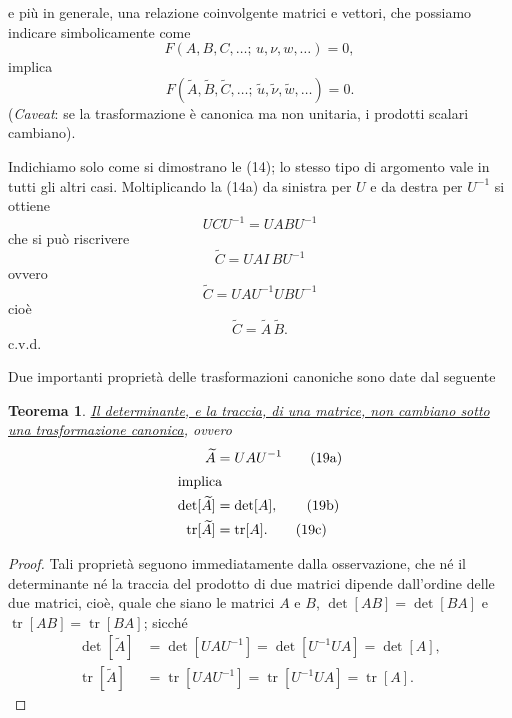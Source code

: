 \documentclass[11pt, a4paper]{book}
\numberwithin{equation}{section}
\newtheorem{teorema}{Teorema}[section]
\begin{document}

e più in generale, una relazione coinvolgente matrici e vettori, che
possiamo indicare simbolicamente come
\begin{equation}
F(A, B, C, \ldots;\, u, \nu, w, \ldots) = 0, \tag{17a}
\end{equation}
implica
\begin{equation}
F(\widetilde{A}, \widetilde{B}, \widetilde{C}, \ldots;\,
  \widetilde{u}, \widetilde{\nu}, \widetilde{w}, \ldots) = 0.
\tag{17b}
\end{equation}
(\emph{Caveat}: se la trasformazione è canonica ma non unitaria, i prodotti
scalari cambiano).

Indichiamo solo come si dimostrano le (14); lo stesso tipo di argomento
vale in tutti gli altri casi. Moltiplicando la (14a) da sinistra per $U$ e
da destra per $U^{-1}$ si ottiene
\[
UCU^{-1} = UABU^{-1}
\]
che si può riscrivere
\[
\widetilde{C} = UAI\,BU^{-1}
\]
ovvero
\[
\widetilde{C} = UAU^{-1}UBU^{-1}
\]
cioè
\[
\widetilde{C} = \widetilde{A}\,\widetilde{B}.
\]
c.v.d.

Due importanti proprietà delle trasformazioni canoniche sono date dal
seguente

\begin{teorema}
\uline{Il determinante, e la traccia, di una matrice, non cambiano sotto
una trasformazione canonica}, ovvero
\begin{align}
\widetilde{A} &= UAU^{-1} \tag{19a} \\
\shortintertext{implica}
\det[\widetilde{A}] &= \det[A], \tag{19b} \\
\operatorname{tr}[\widetilde{A}] &= \operatorname{tr}[A]. \tag{19c}
\end{align}
\end{teorema}

\begin{proof}
Tali proprietà seguono immediatamente dalla osservazione, che né il
determinante né la traccia del prodotto di due matrici dipende
dall'ordine delle due matrici, cioè, quale che siano le matrici $A$ e
$B$, $\det[AB] = \det[BA]$ e $\operatorname{tr}[AB] =
\operatorname{tr}[BA]$; sicché
\begin{align*}
\det[\widetilde{A}] &= \det[UAU^{-1}] = \det[U^{-1}UA] = \det[A], \\
\operatorname{tr}[\widetilde{A}] &= \operatorname{tr}[UAU^{-1}]
  = \operatorname{tr}[U^{-1}UA] = \operatorname{tr}[A].
\end{align*}
\end{proof}
\end{document}

